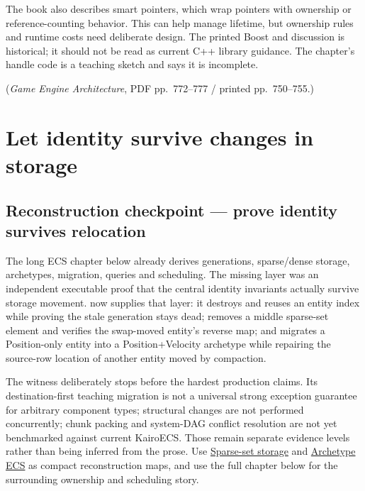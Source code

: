 The book also describes smart pointers, which wrap pointers with ownership or reference-counting behavior. This can help manage lifetime, but ownership rules and runtime costs need deliberate design. The printed Boost and  discussion is historical; it should not be read as current C++ library guidance. The chapter's handle code is a teaching sketch and says it is incomplete.

(\emph{Game Engine Architecture}, PDF pp.~772--777 / printed pp.~750--755.)

\section{Let identity survive changes in storage}\label{05-engine-i-ch014-let-identity-survive-changes-in-storage}

\hypertarget{05-engine-i-ch014-let-identity-survive-changes-in-storage}{}

\subsection{Reconstruction checkpoint --- prove identity survives relocation}\label{05-engine-i-ch014-reconstruction-checkpoint-prove-identity-survives-relocation}

\hypertarget{05-engine-i-ch014-reconstruction-checkpoint-prove-identity-survives-relocation}{}

The long ECS chapter below already derives generations, sparse/dense storage, archetypes, migration, queries and scheduling. The missing layer was an independent executable proof that the central identity invariants actually survive storage movement.  now supplies that layer: it destroys and reuses an entity index while proving the stale generation stays dead; removes a middle sparse-set element and verifies the swap-moved entity's reverse map; and migrates a Position-only entity into a Position+Velocity archetype while repairing the source-row location of another entity moved by compaction.

The witness deliberately stops before the hardest production claims. Its destination-first teaching migration is not a universal strong exception guarantee for arbitrary component types; structural changes are not performed concurrently; chunk packing and system-DAG conflict resolution are not yet benchmarked against current KairoECS. Those remain separate evidence levels rather than being inferred from the prose. Use \hyperref[appendix-8404d0b1a3e7]{Sparse-set storage} and \hyperref[appendix-fbfeb0430008]{Archetype ECS} as compact reconstruction maps, and use the full chapter below for the surrounding ownership and scheduling story.

